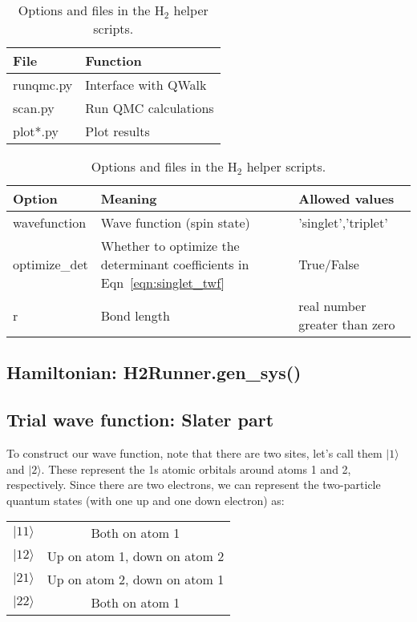 \documentclass[12pt]{article}
\begin{document}
\begin{table}
\caption{Options and files in the H$_2$ helper scripts.}
\begin{tabular}{lp{}}
File & Function \\
\hline
runqmc.py & Interface with QWalk\\
\hline
scan.py & Run QMC calculations \\
\hline
plot*.py & Plot results \\
\hline
\end{tabular}
\vspace{1cm}

\begin{tabular}{lp{}p{}}
Option & Meaning & Allowed values \\
\hline
wavefunction & Wave function (spin state) &  'singlet','triplet'\\
\hline
optimize\_det & Whether to optimize the determinant coefficients in Eqn~\ref{eqn:singlet_twf} &True/False \\
\hline
r & Bond length & real number greater than zero \\
\hline
\end{tabular}
\end{table}


\subsection*{Hamiltonian: H2Runner.gen\_sys() }

\subsection*{Trial wave function: Slater part}

To construct our wave function, note that there are two sites, let's call them $|1\rangle$ and $|2\rangle$. 
These represent the 1s atomic orbitals around atoms 1 and 2, respectively. 
Since there are two electrons, we can represent the two-particle quantum states (with one up and one down electron) as: \\
\begin{tabular}{lc}
$|11\rangle$ & Both on atom 1 \\
$|12\rangle$ & Up on atom 1, down on atom 2 \\
$|21\rangle$ & Up on atom 2, down on atom 1 \\
$|22\rangle$ & Both on atom 1 \\
\end{tabular}\\
\end{document}

